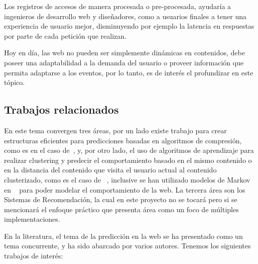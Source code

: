   Los registros de accesos de manera procesada o pre-procesada, ayudaría a ingenieros de desarrollo web y diseñadores, como a  usuarios finales a tener una experiencia de usuario mejor, disminuyendo por ejemplo la latencia en respuestas por parte de cada petición que realizan.
  
  Hoy en día, las web no pueden ser simplemente dinámicas en contenidos, debe poseer una adaptabilidad a la demanda del usuario o proveer información que permita adaptarse a los eventos, por lo tanto, es de interés el profundizar en este tópico.




  \subsection{Trabajos relacionados}

En este tema convergen tres áreas, por un lado existe trabajo para crear estructuras eficientes para predicciones basadas en algoritmos de compresión, como es en el caso de~\cite{Claude2014}, y, por otro lado, el uso de algoritmos de aprendizaje para realizar clustering y predecir el comportamiento basado en el mismo contenido o en la distancia del contenido que visita el usuario actual al contenido clusterizado, como es el caso de ~\cite{Poornalatha2012}, inclusive se han utilizado modelos de Markov en ~\cite{Dongshan2002}  para poder modelar el comportamiento de la web.
La tercera área son los Sistemas de Recomendación, la cual en este proyecto no se tocará pero si se mencionará el enfoque práctico que presenta área como un foco de múltiples implementaciones. 


En la literatura, el tema de la predicción en la web se ha presentado como un tema concurrente, y ha sido abarcado por varios autores. Tenemos los siguientes trabajos de interés:

